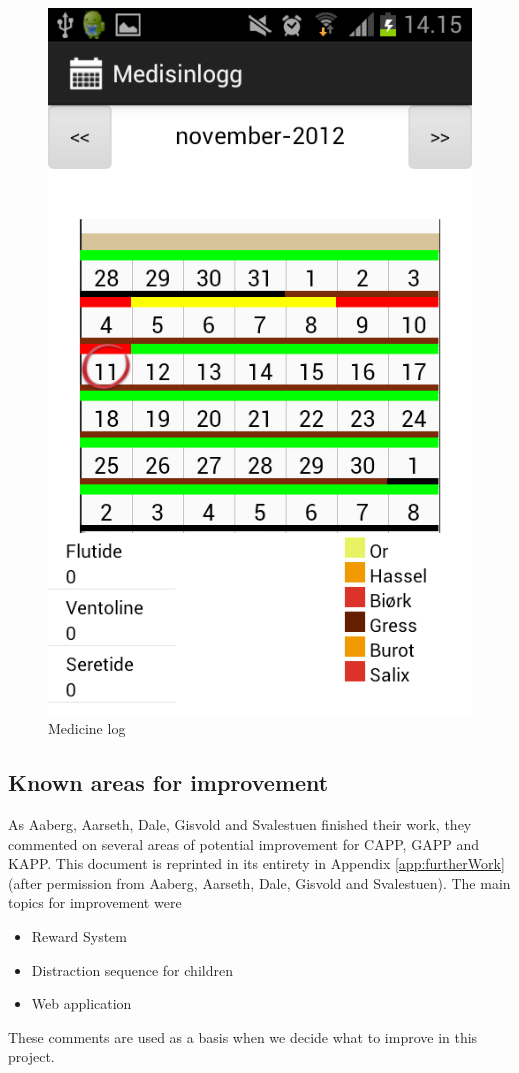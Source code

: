\begin{figure}[H]
\begin{minipage}[b]{0.4\linewidth}
		\includegraphics[width=0.20\paperwidth]{Pictures/app-screenshots/logg.png}
		\caption{Medicine log}
		\label{fig:medicine-log}
	\end{minipage}
	
\end{figure}

\subsection{Known areas for improvement}
\label{sec:improvements}
As Aaberg, Aarseth, Dale, Gisvold and Svalestuen finished their work, they commented on several areas of potential improvement for CAPP, GAPP and KAPP. This document is reprinted in its entirety in Appendix \ref{app:furtherWork} (after permission from Aaberg, Aarseth, Dale, Gisvold and Svalestuen). The main topics for improvement were
\begin{itemize}
\item{Reward System}
\item{Distraction sequence for children}
\item{Web application}
\end{itemize}


These comments are used as a basis when we decide what to improve in this project. 




